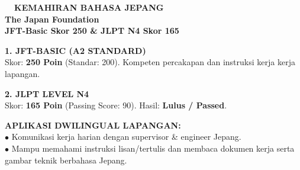 \documentclass[10pt,a4paper,landscape]{article}
\begin{document}
\noindent
\begin{minipage}[t]{0.30\linewidth}
  \vspace{0pt}
  \begin{tcolorbox}[sharp corners, boxrule=0.8pt, colframe=pborder, colback=white, left=3mm, right=3mm, top=2.5mm, bottom=2.5mm, height=100mm]
    \colorbox{pred}{\fontsize{7pt}{8pt}\selectfont\bfseries\color{white}\ \ KEMAHIRAN BAHASA JEPANG\ \ }\\[1.5mm]
    {\fontsize{9.5pt}{11.5pt}\selectfont\bfseries\color{pnavy}The Japan Foundation}\\[0.5mm]
    {\fontsize{7pt}{8.5pt}\selectfont\bfseries\color{pred}JFT-Basic Skor 250 \& JLPT N4 Skor 165}\\[2mm]

    \begin{tcolorbox}[sharp corners, boxrule=0.5pt, colframe=pborder, colback=pbglight, left=2mm, right=2mm, top=1.5mm, bottom=1.5mm]
      {\fontsize{6.8pt}{8pt}\selectfont\bfseries\color{pnavy}1. JFT-BASIC (A2 STANDARD)}\\[0.3mm]
      {\fontsize{6.5pt}{7.8pt}\selectfont
      Skor: \textbf{\color{pred}250 Poin} (Standar: 200). Kompeten percakapan dan instruksi kerja kerja lapangan.
      }
    \end{tcolorbox}
    \vspace{1.2mm}

    \begin{tcolorbox}[sharp corners, boxrule=0.5pt, colframe=pborder, colback=pbglight, left=2mm, right=2mm, top=1.5mm, bottom=1.5mm]
      {\fontsize{6.8pt}{8pt}\selectfont\bfseries\color{pnavy}2. JLPT LEVEL N4}\\[0.3mm]
      {\fontsize{6.5pt}{7.8pt}\selectfont
      Skor: \textbf{\color{pred}165 Poin} (Passing Score: 90). Hasil: \textbf{Lulus / Passed}.
      }
    \end{tcolorbox}
  \end{tcolorbox}
  \vspace{2mm}

  \begin{tcolorbox}[sharp corners, boxrule=0.6pt, colframe=pnavy, colback=pbglight, left=2.5mm, right=2.5mm, top=2mm, bottom=2mm, height=52mm]
    {\fontsize{7pt}{8.5pt}\selectfont\bfseries\color{pnavy}APLIKASI DWILINGUAL LAPANGAN:}\\[1.5mm]
    {\fontsize{6.5pt}{8.2pt}\selectfont\color{psteel}
    $\bullet$ Komunikasi kerja harian dengan supervisor \& engineer Jepang.\\
    $\bullet$ Mampu memahami instruksi lisan/tertulis dan membaca dokumen kerja serta gambar teknik berbahasa Jepang.
    }
  \end{tcolorbox}
\end{minipage}%
\end{document}
